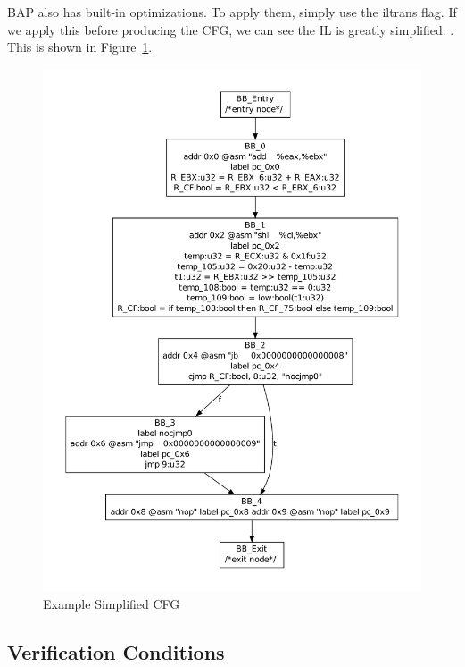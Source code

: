 BAP also has built-in optimizations.  To apply them, simply use the
 iltrans flag.  If we apply this before producing
the CFG, we can see the IL is greatly simplified: . This is shown in
Figure~\ref{fig:cfgsimp}.

\begin{figure}
  \begin{center}
    \includegraphics[height=.9\textheight]{chap-examples/cfg_simp.pdf}
  \end{center}
  \caption{Example Simplified CFG}
  \label{fig:cfgsimp}
\end{figure}


\subsection{Verification Conditions}

